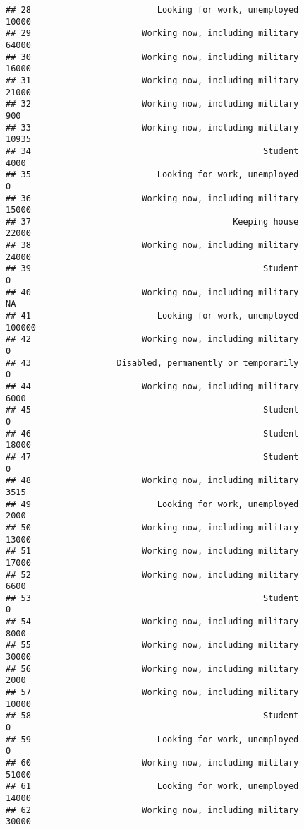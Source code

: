\documentclass[]{book}
\theoremstyle{definition}
\theoremstyle{definition}
\theoremstyle{remark}
\begin{document}
\begin{verbatim}
## 28                         Looking for work, unemployed           10000
## 29                      Working now, including military           64000
## 30                      Working now, including military           16000
## 31                      Working now, including military           21000
## 32                      Working now, including military             900
## 33                      Working now, including military           10935
## 34                                              Student            4000
## 35                         Looking for work, unemployed               0
## 36                      Working now, including military           15000
## 37                                        Keeping house           22000
## 38                      Working now, including military           24000
## 39                                              Student               0
## 40                      Working now, including military              NA
## 41                         Looking for work, unemployed          100000
## 42                      Working now, including military               0
## 43                 Disabled, permanently or temporarily               0
## 44                      Working now, including military            6000
## 45                                              Student               0
## 46                                              Student           18000
## 47                                              Student               0
## 48                      Working now, including military            3515
## 49                         Looking for work, unemployed            2000
## 50                      Working now, including military           13000
## 51                      Working now, including military           17000
## 52                      Working now, including military            6600
## 53                                              Student               0
## 54                      Working now, including military            8000
## 55                      Working now, including military           30000
## 56                      Working now, including military            2000
## 57                      Working now, including military           10000
## 58                                              Student               0
## 59                         Looking for work, unemployed               0
## 60                      Working now, including military           51000
## 61                         Looking for work, unemployed           14000
## 62                      Working now, including military           30000

\end{verbatim}
\end{document}
